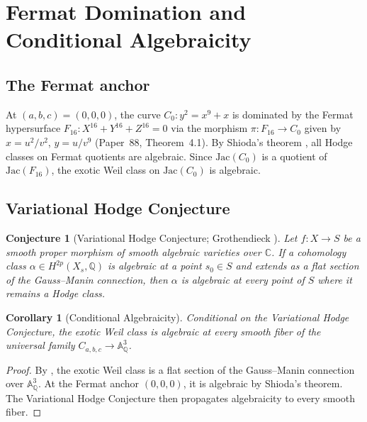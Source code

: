 \documentclass[11pt,a4paper]{article}
\newtheorem{corollary}[theorem]{Corollary}
\newtheorem{conjecture}[theorem]{Conjecture}
\theoremstyle{definition}
\theoremstyle{remark}
\newcommand{\QQ}{\mathbb{Q}}
\newcommand{\CC}{\mathbb{C}}
\newcommand{\Aff}{\mathbb{A}}
\newcommand{\Jac}{\mathrm{Jac}}
\begin{document}
\section{Fermat Domination and Conditional Algebraicity}

\subsection{The Fermat anchor}

At $(a,b,c) = (0,0,0)$, the curve $C_0: y^2 = x^9 + x$ is dominated by
the Fermat hypersurface $F_{16}: X^{16} + Y^{16} + Z^{16} = 0$ via the
morphism $\pi: F_{16} \to C_0$ given by $x = u^2/v^2$, $y = u/v^9$
(Paper~88, Theorem~4.1).
By Shioda's theorem \cite{Shioda1982}, all Hodge classes on Fermat
quotients are algebraic.
Since $\Jac(C_0)$ is a quotient of $\Jac(F_{16})$, the exotic Weil class
on $\Jac(C_0)$ is algebraic.

\subsection{Variational Hodge Conjecture}

\begin{conjecture}[Variational Hodge Conjecture; Grothendieck \cite{Grothendieck1966}]\label{thm:VHC}
Let $f: X \to S$ be a smooth proper morphism of smooth algebraic varieties
over $\CC$.
If a cohomology class $\alpha \in H^{2p}(X_s, \QQ)$ is algebraic at a
point $s_0 \in S$ and extends as a flat section of the Gauss--Manin
connection, then $\alpha$ is algebraic at every point of $S$ where it
remains a Hodge class.
\end{conjecture}

\begin{corollary}[Conditional Algebraicity]\label{cor:conditional}
Conditional on the Variational Hodge Conjecture, the exotic Weil class
is algebraic at every smooth fiber of the universal family
$C_{a,b,c} \to \Aff^3_\QQ$.
\end{corollary}

\begin{proof}
By , the exotic Weil class is a flat section
of the Gauss--Manin connection over $\Aff^3_\QQ$.
At the Fermat anchor $(0,0,0)$, it is algebraic by Shioda's theorem.
The Variational Hodge Conjecture then propagates algebraicity to every
smooth fiber.
\end{proof}
\end{document}
